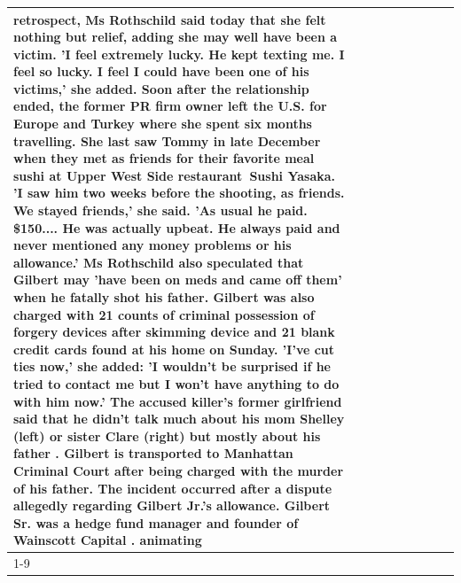 \begin{table}[H]
\begin{tabular}{lllrlllll}
retrospect, Ms Rothschild said today that she felt nothing but relief, adding she may well have been a victim. 'I feel extremely lucky. He kept texting me. I feel so lucky. I feel I could have been one of his victims,' she added. Soon after the relationship ended, the former PR firm owner left the U.S. for Europe and Turkey where she spent six months  travelling. She last saw Tommy in late December when they met as friends for their favorite meal sushi at Upper West Side restaurant Sushi Yasaka. 'I saw him two weeks before the shooting, as friends. We stayed friends,' she said. 'As usual he paid. \$150.... He was actually upbeat. He always paid and never mentioned any money problems or his allowance.' Ms Rothschild also speculated that Gilbert may 'have been on meds and came off them' when he fatally shot his father. Gilbert was also charged with 21 counts of criminal possession of forgery devices after skimming device and 21 blank credit cards found at his home on Sunday. 'I've cut ties now,' she added: 'I wouldn’t be surprised if he tried to contact me but I won’t have anything to do with him now.' The accused killer's former girlfriend said that he didn't talk much about his mom Shelley (left) or sister Clare (right) but mostly about his father . Gilbert is transported to Manhattan Criminal Court  after being charged with the murder of his father. The incident occurred after a dispute allegedly regarding Gilbert Jr.'s allowance. Gilbert Sr. was a hedge fund manager and founder of Wainscott Capital . animating \\
\cline{1-9} \cline{2-9}

\end{tabular}
\end{table}
